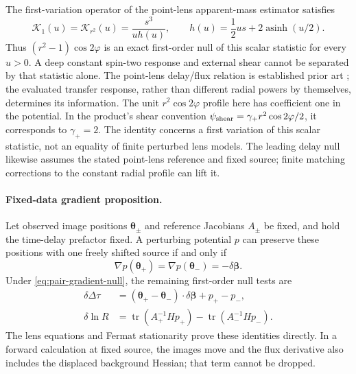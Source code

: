 The first-variation operator of the point-lens apparent-mass estimator satisfies
\begin{equation}
 \mathcal K_{1}(u)=\mathcal K_{r^2}(u)
 =\frac{s^3}{u h(u)},\qquad
 h(u)=\frac12us+2\operatorname{asinh}(u/2).
\end{equation}
Thus $(r^2-1)\cos2\varphi$ is an exact first-order null of this scalar statistic for every $u>0$. A deep constant spin-two response and external shear cannot be separated by that statistic alone. The point-lens delay/flux relation is established prior art \cite{Munoz2016}; the evaluated transfer response, rather than different radial powers by themselves, determines its information.
The unit $r^2\cos2\varphi$ profile here has coefficient one in the
potential. In the product's shear convention
$\psi_{\rm shear}=\gamma_+r^2\cos2\varphi/2$, it corresponds to
$\gamma_+=2$. The identity concerns a first variation of this scalar
statistic, not an equality of finite perturbed lens models. The leading
delay null likewise assumes the stated point-lens reference and fixed
source; finite matching corrections to the constant radial profile can
lift it.

\paragraph{Fixed-data gradient proposition.}
Let observed image positions $\boldsymbol\theta_\pm$ and reference Jacobians $A_\pm$ be fixed, and hold the time-delay prefactor fixed. A perturbing potential $p$ can preserve these positions with one freely shifted source if and only if
\begin{equation}
 \nabla p(\boldsymbol\theta_+)=\nabla p(\boldsymbol\theta_-)
 =-\delta\boldsymbol\beta.\label{eq:pair-gradient-null}
\end{equation}
Under \eqref{eq:pair-gradient-null}, the remaining first-order null tests are
\begin{align}
 \delta\Delta\tau&=(\boldsymbol\theta_+-\boldsymbol\theta_-)
 \cdot\delta\boldsymbol\beta+p_+-p_-,\\
 \delta\ln R&=\operatorname{tr}(A_+^{-1}H p_+)
 -\operatorname{tr}(A_-^{-1}H p_-).
\end{align}
The lens equations and Fermat stationarity prove these identities directly. In a forward calculation at fixed source, the images move and the flux derivative also includes the displaced background Hessian; that term cannot be dropped.


